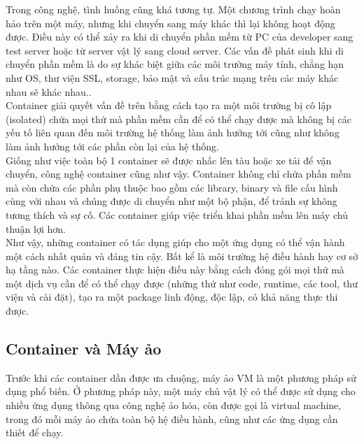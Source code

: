 \documentclass[14pt,a4paper]{report}
\begin{document}
	\hspace{0.3cm}Trong công nghệ, tình huống cũng khá tương tự. Một chương trình chạy hoàn hảo trên một máy, nhưng khi chuyển sang máy khác thì lại không hoạt động được. Điều này có thể xảy ra khi di chuyển phần mềm từ PC của developer sang test server hoặc từ server vật lý sang cloud server. Các vấn đề phát sinh khi di chuyển phần mềm là do sự khác biệt giữa các môi trường máy tính, chẳng hạn như OS, thư viện SSL, storage, bảo mật và cấu trúc mạng trên các máy khác nhau sẽ khác nhau..\\
	
	\hspace{0.3cm}Container giải quyết vấn đề trên bằng cách tạo ra một môi trường bị cô lập (isolated) chứa mọi thứ mà phần mềm cần để có thể chạy được mà không bị các yếu tố liên quan đến môi trường hệ thống làm ảnh hưởng tới cũng như không làm ảnh hưởng tới các phần còn lại của hệ thống.\\
	
	\hspace{0.3cm}Giống như việc toàn bộ 1 container sẽ được nhấc lên tàu hoặc xe tải để vận chuyển, công nghệ container cũng như vậy. Container không chỉ chứa phần mềm mà còn chứa các phần phụ thuộc bao gồm các library, binary và file cấu hình cùng với nhau và chúng được di chuyển như một bộ phận, để tránh sự không tương thích và sự cố. Các container giúp việc triển khai phần mềm lên máy chủ thuận lợi hơn.\\
	
	\hspace{0.3cm}Như vậy, những container có tác dụng giúp cho một ứng dụng có thể vận hành một cách nhất quán và đáng tin cậy. Bất kể là môi trường hệ điều hành hay cơ sở hạ tầng nào. Các container thực hiện điều này bằng cách đóng gói mọi thứ mà một dịch vụ cần để có thể chạy được (những thứ như code, runtime, các tool, thư viện và cài đặt), tạo ra một package linh động, độc lập, có khả năng thực thi được.
	\subsection{Container và Máy ảo}
	\hspace{1cm}Trước khi các container dần được ưa chuộng, máy ảo VM là một phương pháp sử dụng phổ biến. Ở phương pháp này, một máy chủ vật lý có thể được sử dụng cho nhiều ứng dụng thông qua công nghệ ảo hóa, còn được gọi là virtual machine, trong đó mỗi máy ảo chứa toàn bộ hệ điều hành, cũng như các ứng dụng cần thiết để chạy.\\
\end{document}
